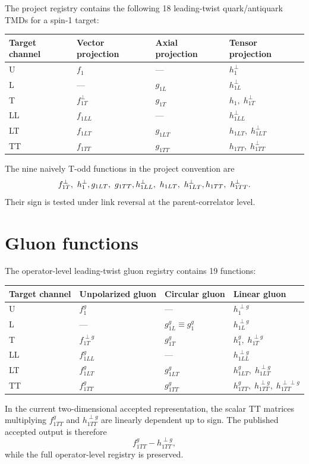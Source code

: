 \documentclass[11pt,oneside]{book}
\begin{document}
The project registry contains the following 18 leading-twist quark/antiquark TMDs for a spin-1 target:
\begin{longtable}{llll}
\toprule
\textbf{Target channel}&\textbf{Vector projection}&\textbf{Axial projection}&\textbf{Tensor projection}\\
\midrule
U&$f_1$&---&$h_1^{\perp}$\\
L&---&$g_{1L}$&$h_{1L}^{\perp}$\\
T&$f_{1T}^{\perp}$&$g_{1T}$&$h_1,\;h_{1T}^{\perp}$\\
LL&$f_{1LL}$&---&$h_{1LL}^{\perp}$\\
LT&$f_{1LT}$&$g_{1LT}$&$h_{1LT},\;h_{1LT}^{\perp}$\\
TT&$f_{1TT}$&$g_{1TT}$&$h_{1TT},\;h_{1TT}^{\perp}$\\
\bottomrule
\end{longtable}
The nine naively T-odd functions in the project convention are
\begin{equation}
 f_{1T}^{\perp},\ h_1^{\perp},\\
 g_{1LT},\ g_{1TT},\\
 h_{1LL}^{\perp},\ h_{1LT},\ h_{1LT}^{\perp},\\
 h_{1TT},\ h_{1TT}^{\perp}.
\end{equation}
Their sign is tested under link reversal at the parent-correlator level.

\section{Gluon functions}

The operator-level leading-twist gluon registry contains 19 functions:
\begin{longtable}{llll}
\toprule
\textbf{Target channel}&\textbf{Unpolarized gluon}&\textbf{Circular gluon}&\textbf{Linear gluon}\\
\midrule
U&$f_1^g$&---&$h_1^{\perp g}$\\
L&---&$g_{1L}^g\equiv g_1^g$&$h_{1L}^{\perp g}$\\
T&$f_{1T}^{\perp g}$&$g_{1T}^g$&$h_1^g,\;h_{1T}^{\perp g}$\\
LL&$f_{1LL}^g$&---&$h_{1LL}^{\perp g}$\\
LT&$f_{1LT}^g$&$g_{1LT}^g$&$h_{1LT}^g,\;h_{1LT}^{\perp g}$\\
TT&$f_{1TT}^g$&$g_{1TT}^g$&$h_{1TT}^g,\;h_{1TT}^{\perp g},\;h_{1TT}^{\perp\perp g}$\\
\bottomrule
\end{longtable}
In the current two-dimensional accepted representation, the scalar TT matrices multiplying $f_{1TT}^g$ and $h_{1TT}^{\perp g}$ are linearly dependent up to sign.  The published accepted output is therefore
\begin{equation}
 f_{1TT}^g-h_{1TT}^{\perp g},
\end{equation}
while the full operator-level registry is preserved.
\end{document}
